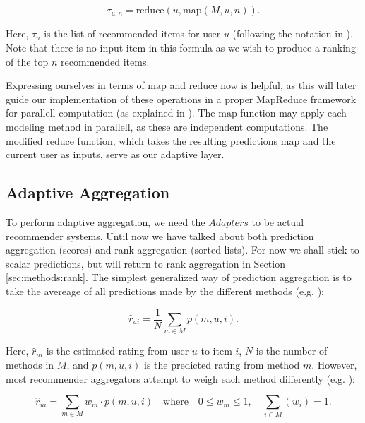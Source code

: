 \begin{equation*}
  \tau_{u,n} = \mathrm{reduce}(u, \mathrm{map}(M,u,n)).
\end{equation*}

Here, $\tau_{u}$ is the list of recommended items for user $u$ (following the notation in \citet[p3]{Dwork2001}).
Note that there is no input item in this formula as we wish to produce a ranking of the top $n$ recommended items.

Expressing ourselves in terms of $\mathrm{map}$ and $\mathrm{reduce}$ now is helpful, as this will later
guide our implementation of these operations in a proper MapReduce framework
for parallell computation (as explained in \citet[p75]{Manning2008}).
The $\mathrm{map}$ function may apply each modeling method in parallell, 
as these are independent computations.
The modified $\mathrm{reduce}$ function, which takes the resulting predictions $\mathrm{map}$ and the current
user as inputs, serve as our adaptive layer.


\subsection{Adaptive Aggregation}

To perform adaptive aggregation, we need the $Adapters$ to be actual recommender systems.
Until now we have talked about both prediction aggregation (scores) and rank aggregation (sorted lists).
For now we shall stick to scalar predictions, but will return to rank aggregation in Section \ref{sec:methods:rank}.
The simplest generalized way of prediction aggregation is to take the avereage of all predictions made
by the different methods (e.g. \citet[p3]{Aslam2001}):

\begin{equation*}
  \hat{r}_{ui} = \frac{1}{N} \sum_{m \in M} p(m,u,i).
\end{equation*}

Here, $\hat{r}_{ui}$ is the estimated rating from user $u$ to item $i$,
$N$ is the number of methods in $M$, and $p(m,u,i)$ is the predicted rating from method $m$.
However, most recommender aggregators attempt to weigh each method differently (e.g. \cite{Claypool1999}):

\begin{equation*}
  \hat{r}_{ui} = \sum_{m \in M} w_{m} \cdot p(m,u,i) 
  \quad \text{where} \quad 0 \leq w_{m} \leq 1, \quad \sum_{i \in M} (w_i) = 1.
\end{equation*}

